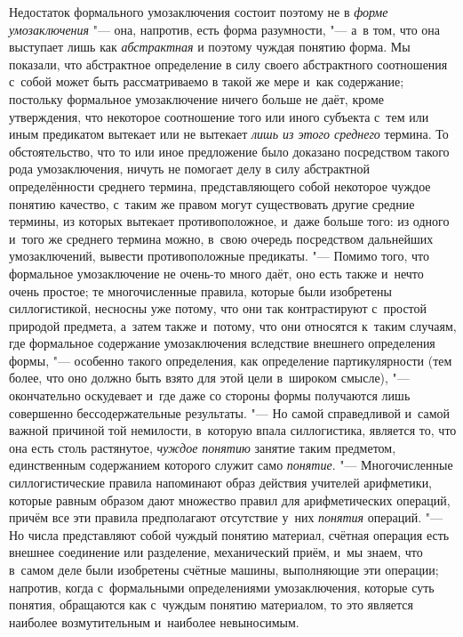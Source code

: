 Недостаток формального умозаключения состоит поэтому не в
{\em форме умозаключения}
"--- она, напротив, есть форма разумности, "--- а~в
том, что она выступает лишь как
{\em абстрактная} и
поэтому чуждая понятию форма. Мы показали, что абстрактное определение в
силу своего абстрактного соотношения с~собой может быть рассматриваемо в
такой же мере и~как содержание; постольку формальное умозаключение ничего
больше не даёт, кроме утверждения, что некоторое соотношение того или иного
субъекта с~тем или иным предикатом вытекает или не вытекает
{\em лишь из этого среднего}
термина. То обстоятельство, что то или иное предложение было
доказано посредством такого рода умозаключения, ничуть не помогает делу в
силу абстрактной определённости среднего термина, представляющего собой
некоторое чуждое понятию качество, с~таким же правом могут существовать
другие средние термины, из которых вытекает противоположное, и~даже больше
того: из одного и~того же среднего термина можно, в~свою очередь
посредством дальнейших умозаключений, вывести противоположные предикаты. "---
Помимо того, что формальное умозаключение не очень-то много
даёт, оно есть также и~нечто очень простое; те многочисленные правила,
которые были изобретены силлогистикой, несносны уже потому, что они так
контрастируют с~простой природой предмета, а~затем также и~потому, что они
относятся к~таким случаям, где формальное содержание
умозаключения вследствие внешнего определения формы, "---
особенно такого определения, как определение партикулярности
(тем более, что оно должно быть взято для этой цели в~широком смысле), "---
окончательно оскудевает и~где даже со стороны формы
получаются лишь совершенно бессодержательные результаты. "---
Но самой справедливой и~самой важной причиной той немилости,
в~которую впала силлогистика, является то, что она есть столь растянутое,
{\em чуждое понятию}
занятие таким предметом, единственным содержанием которого
служит само {\em понятие}. "---
Многочисленные силлогистические правила напоминают образ
действия учителей арифметики, которые равным образом дают множество правил
для арифметических операций, причём все эти правила предполагают отсутствие
у~них {\em понятия}
операций. "--- Но числа представляют собой чуждый
понятию материал, счётная операция есть внешнее соединение или разделение,
механический приём, и~мы знаем, что в~самом деле были изобретены счётные
машины, выполняющие эти операции; напротив, когда с~формальными
определениями умозаключения, которые суть понятия, обращаются как с~чуждым
понятию материалом, то это является наиболее возмутительным и~наиболее
невыносимым.

